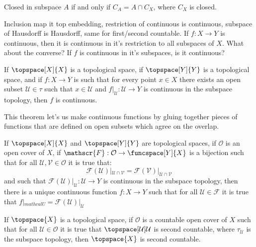 \documentclass{article}                                                        %
\begin{document}
        \begin{theorem}
            Closed in subspace $A$ if and only if $C_{A}=A\cap{C}_{X}$, where
            $C_{X}$ is closed.
        \end{theorem}
        Inclusion map it top embedding, restriction of continuous is continuous,
        subspace of Hausdorff is Hausdorff, same for first/second countable.
        If $f:X\rightarrow{Y}$ is continuous, then it is continuous in it's
        restriction to all subspaces of $X$. What about the converse? If
        $f$ is continuous in it's subspaces, is it continuous?
        \begin{theorem}
            If $\topspace[X]{X}$ is a topological space, if $\topspace[Y]{Y}$ is
            a topological space, and if $f:X\rightarrow{Y}$ is such that for
            every point $x\in{X}$ there exists an open subset
            $\mathcal{U}\in\tau$ such that $x\in\mathcal{U}$ and
            $f|_{\mathcal{U}}:\mathcal{U}\rightarrow{Y}$ is continuous in the
            subspace topology, then $f$ is continuous.
        \end{theorem}
        This theorem let's us make continuous functions by gluing together
        pieces of functions that are defined on open subsets which agree on the
        overlap.
        \begin{theorem}
            If $\topspace[X]{X}$ and $\topspace[Y]{Y}$ are topological spaces,
            if $\mathcal{O}$ is an open cover of $X$, if
            $\mathscr{F}:\mathcal{O}\rightarrow\funcspace[Y]{X}$ is a bijection
            such that for all $\mathcal{U},\mathcal{V}\in\mathcal{O}$ it is true
            that:
            \begin{equation}
                \mathscr{F}(\mathcal{U})|_{\mathcal{U}\cap\mathcal{V}}=
                \mathscr{F}(\mathcal{V})|_{\mathcal{U}\cap\mathcal{V}}
            \end{equation}
            and such that
            $\mathscr{F}(\mathcal{U})|_{\mathcal{U}}:\mathcal{U}\rightarrow{Y}$
            is continuous in the subspace topology, then there is a unique
            continuous function $f:X\rightarrow{Y}$ such that for all
            $\mathcal{U}\in\mathscr{F}$ it is true that
            $f|_{mathcal{U}}=\mathscr{F}(\mathcal{U})|_{\mathcal{U}}$
        \end{theorem}
        \begin{theorem}
            If $\topspace{X}$ is a topological space, if
            $\mathcal{O}$ is a countable open cover of $X$ such that for all
            $\mathcal{U}\in\mathcal{O}$ it is true that
            $\topspace[\mathcal{U}]{\mathcal{U}}$ is second countable, where
            $\tau_{\mathcal{U}}$ is the subspace topology, then $\topspace{X}$
            is second countable.
        \end{theorem}
\end{document}
